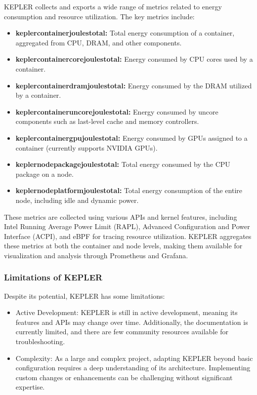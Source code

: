 KEPLER collects and exports a wide range of metrics related to energy consumption and resource utilization. The key metrics include:
\begin{itemize}
\item \textbf{kepler\textunderscore container\textunderscore joules\textunderscore total:} Total energy consumption of a container, aggregated from CPU, DRAM, and other components.
\item \textbf{kepler\textunderscore container\textunderscore core\textunderscore joules\textunderscore total:} Energy consumed by CPU cores used by a container.
\item \textbf{kepler\textunderscore container\textunderscore dram\textunderscore joules\textunderscore total:} Energy consumed by the DRAM utilized by a container.
\item \textbf{kepler\textunderscore container\textunderscore uncore\textunderscore joules\textunderscore total:} Energy consumed by uncore components such as last-level cache and memory controllers.
\item \textbf{kepler\textunderscore container\textunderscore gpu\textunderscore joules\textunderscore total:} Energy consumed by GPUs assigned to a container (currently supports NVIDIA GPUs).
\item \textbf{kepler\textunderscore node\textunderscore package\textunderscore joules\textunderscore total:} Total energy consumed by the CPU package on a node.
\item \textbf{kepler\textunderscore node\textunderscore platform\textunderscore joules\textunderscore total:} Total energy consumption of the entire node, including idle and dynamic power.
\end{itemize}
These metrics are collected using various APIs and kernel features, including Intel Running Average Power Limit (RAPL), Advanced Configuration and Power Interface (ACPI), and eBPF for tracing resource utilization. KEPLER aggregates these metrics at both the container and node levels, making them available for visualization and analysis through Prometheus and Grafana.

\subsubsection{Limitations of KEPLER}

Despite its potential, KEPLER has some limitations:
\begin{itemize}
\item Active Development: KEPLER is still in active development, meaning its features and APIs may change over time. Additionally, the documentation is currently limited, and there are few community resources available for troubleshooting.
\item Complexity: As a large and complex project, adapting KEPLER beyond basic configuration requires a deep understanding of its architecture. Implementing custom changes or enhancements can be challenging without significant expertise.
\end{itemize}

